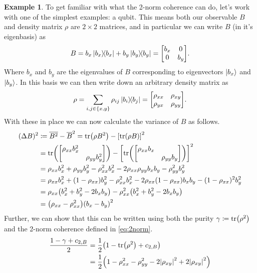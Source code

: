 \documentclass[11pt,english]{article}
\theoremstyle{definition}
\newtheorem{example}{Example}[section]
\newcommand{\twonormE}[1][\rho]{c_{2,B}}
\begin{document}
\begin{example}\label{ex:qubits}
	To get familiar with what the 2-norm coherence can do, let's work with one of the simplest examples: a qubit. This means both our observable $B$ and density matrix $\rho$ are $2\times 2$ matrices, and in particular we can write $B$ (in it's eigenbasis) as
	\begin{equation*}
		B = b_x\ketbra{b_x} + b_y\ketbra{b_y} = \mqty[b_x & 0 \\ 0 & b_y].
	\end{equation*}
	Where $b_x$ and $b_y$ are the eigenvalues of $B$ corresponding to eigenvectors $\ket{b_x}$ and $\ket{b_y}$. In this basis we can then write down an arbitrary density matrix as
	\begin{equation*}
		\rho = \sum_{i, j\in \{x, y\}}\rho_{ij}\ketbra{b_i}{b_j} = \mqty[\rho_{xx} & \rho_{xy} \\ \rho_{yx} & \rho_{yy}].
	\end{equation*}
	With these in place we can now calculate the variance of $B$ as follows.
	\begin{align*}
		(\Delta B)^2 & \coloneqq \overline{B^2} - \overline{B}^2 = \tr(\rho B^2) - \qty[\tr(\rho B)]^2                                        \\
		             & = \tr(\mqty[\dmat{\rho_{xx}b_x^2, \rho_{yy}b_y^2}]) - \qty[\tr(\mqty[\dmat{\rho_{xx}b_x, \rho_{yy}b_y}])]^2            \\
		             & = \rho_{xx}b_x^2 + \rho_{yy}b_y^2 - \rho_{xx}^2b_x^2 - 2\rho_{xx}\rho_{yy}b_x b_y - \rho_{yy}^2b_y^2                   \\
		             & = \rho_{xx}b_x^2 + (1 - \rho_{xx})b_y^2 - \rho_{xx}^2b_x^2 - 2\rho_{xx}(1 - \rho_{xx})b_x b_y - (1 - \rho_{xx})^2b_y^2 \\
		             & = \rho_{xx}\qty(b_x^2 + b_y^2 - 2b_x b_y) - \rho_{xx}^2\qty(b_x^2 + b_y^2 - 2b_x b_y)                                  \\
		             & = \qty(\rho_{xx} - \rho_{xx}^2)\qty(b_x - b_y)^2
	\end{align*}
	Further, we can show that this can be written using both the purity $\gamma\coloneqq\tr(\rho^2)$ and the 2-norm coherence defined in \cref{eq:2norm}.
	\begin{align*}
		\frac{1 - \gamma + \twonormE}{2} & = \frac{1}{2}\qty(1 - \tr(\rho^2) + \twonormE)                                             \\
		                                 & = \frac{1}{2}\qty(1 - \rho_{xx}^2 - \rho_{yy}^2 - 2\abs{\rho_{xy}}^2 + 2\abs{\rho_{xy}}^2) \\

\end{align*}
\end{example}
\end{document}
